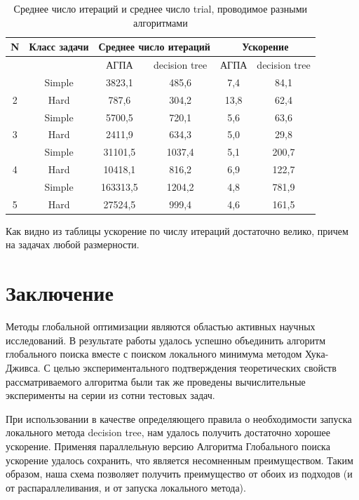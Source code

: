 \documentclass{svproc}
\begin{document}
\begin{table}[h!]
	\caption{Среднее число итераций и среднее число trial, проводимое разными алгоритмами}
	\label{tab:2}
	\centering
	\begin{tabular}{|c|c|c|c|c|c|}
		\hline
		
		N & Класс задачи & \multicolumn{2}{c|}{Среднее число итераций} & \multicolumn{2}{c|}{Ускорение} \\ \hline
		& ~ & АГПА & decision tree & АГПА & decision tree \\ \hline
		& Simple & 3823,1   & 485,6  & 7,4   & 84,1 \\ \hline
		2  & Hard & 787,6    & 304,2  & 13,8  & 62,4  \\ \hline
		& Simple & 5700,5   & 720,1  & 5,6   & 63,6  \\ \hline
		3  & Hard & 2411,9   & 634,3  & 5,0   & 29,8  \\ \hline
		& Simple & 31101,5  & 1037,4 & 5,1   & 200,7  \\ \hline
		4  & Hard & 10418,1  & 816,2  & 6,9   & 122,7  \\ \hline
		& Simple & 163313,5 & 1204,2 & 4,8   & 781,9  \\ \hline
		5  & Hard & 27524,5  & 999,4  & 4,6   & 161,5  \\ \hline
	\end{tabular}
\end{table}

Как видно из таблицы ускорение по числу итераций достаточно велико, причем на задачах любой размерности. 

\section{Заключение}\label{SecC}

Методы глобальной оптимизации являются областью активных научных исследований.  В результате работы удалось успешно объединить алгоритм глобального поиска вместе с поиском локального минимума методом Хука-Дживса. С целью экспериментального подтверждения теоретических свойств рассматриваемого алгоритма были так же проведены вычислительные эксперименты на серии из сотни тестовых задач. 

При использовании в качестве определяющего правила о необходимости запуска локального метода decision tree, нам удалось получить достаточно хорошее ускорение. Применяя параллельную версию Алгоритма Глобального поиска ускорение удалось сохранить, что является несомненным преимуществом. Таким образом, наша схема позволяет получить преимущество от обоих из подходов (и от распараллеливания, и от запуска локального метода).
\end{document}
